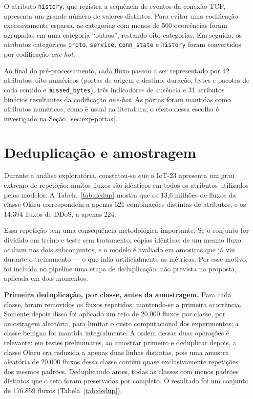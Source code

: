 O atributo \texttt{history}, que registra a sequência de eventos da conexão TCP, apresenta um grande número de valores distintos. Para evitar uma codificação excessivamente esparsa, as categorias com menos de 500 ocorrências foram agrupadas em uma categoria ``outros'', restando oito categorias. Em seguida, os atributos categóricos \texttt{proto}, \texttt{service}, \texttt{conn\_state} e \texttt{history} foram convertidos por codificação \textit{one-hot}.

Ao final do pré-processamento, cada fluxo passou a ser representado por 42 atributos: oito numéricos (portas de origem e destino, duração, bytes e pacotes de cada sentido e \texttt{missed\_bytes}), três indicadores de ausência e 31 atributos binários resultantes da codificação \textit{one-hot}. As portas foram mantidas como atributos numéricos, como é usual na literatura; o efeito dessa escolha é investigado na Seção~\ref{sec:exp-portas}.

\section{Deduplicação e amostragem}
\label{sec:dedup}

Durante a análise exploratória, constatou-se que o IoT-23 apresenta um grau extremo de repetição: muitos fluxos são idênticos em todos os atributos utilizados pelos modelos. A Tabela~\ref{tab:dedup} mostra que os 13,6 milhões de fluxos da classe Okiru correspondem a apenas 621 combinações distintas de atributos, e os 14.394 fluxos de DDoS, a apenas 224.

Essa repetição tem uma consequência metodológica importante. Se o conjunto for dividido em treino e teste sem tratamento, cópias idênticas de um mesmo fluxo acabam nos dois subconjuntos, e o modelo é avaliado em amostras que já viu durante o treinamento --- o que infla artificialmente as métricas. Por esse motivo, foi incluída no pipeline uma etapa de deduplicação, não prevista na proposta, aplicada em dois momentos.

\textbf{Primeira deduplicação, por classe, antes da amostragem.} Para cada classe, foram removidos os fluxos repetidos, mantendo-se a primeira ocorrência. Somente depois disso foi aplicado um teto de 20.000 fluxos por classe, por amostragem aleatória, para limitar o custo computacional dos experimentos; a classe benigna foi mantida integralmente. A ordem dessas duas operações é relevante: em testes preliminares, ao amostrar primeiro e deduplicar depois, a classe Okiru era reduzida a apenas duas linhas distintas, pois uma amostra aleatória de 20.000 fluxos dessa classe contém quase exclusivamente repetições dos mesmos padrões. Deduplicando antes, todas as classes com menos padrões distintos que o teto foram preservadas por completo. O resultado foi um conjunto de 176.859 fluxos (Tabela~\ref{tab:dedup}).

